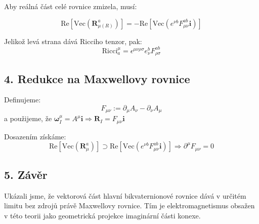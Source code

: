 Aby reálná část celé rovnice zmizela, musí:

\[
\text{Re}[\text{Vec}(\mathbf{R}^{a}_{\mu (R)})] = - \text{Re}[\text{Vec}(e^{\nu b} F_{\mu\nu}^{ab} \mathbf{i})]
\]

Jelikož levá strana dává Ricciho tenzor, pak:
\[
\text{Ricci}^\mu_a = \epsilon^{\mu\nu\rho\sigma} e^b_\nu F_{\rho\sigma}^{ab}
\]

\subsection*{4. Redukce na Maxwellovy rovnice}

Definujeme:
\[
F_{\mu\nu} := \partial_\mu A_\nu - \partial_\nu A_\mu
\]
a použijeme, že $\boldsymbol{\omega}_I^\mu = A^\mu \mathbf{i} \Rightarrow \mathbf{R}_I = F_{\mu\nu} \mathbf{i}$

Dosazením získáme:
\[
\text{Re}[\text{Vec}(\mathbf{R}^a_\mu)] \supset \text{Re}[\text{Vec}(e^{\nu b} F_{\mu\nu}^{ab} \mathbf{i})]
\Rightarrow \partial^\mu F_{\mu\nu} = 0
\]

\subsection*{5. Závěr}

Ukázali jsme, že vektorová část hlavní bikvaternionové rovnice dává v určitém limitu bez zdrojů právě Maxwellovy rovnice. Tím je elektromagnetismus obsažen v této teorii jako geometrická projekce imaginární části konexe.